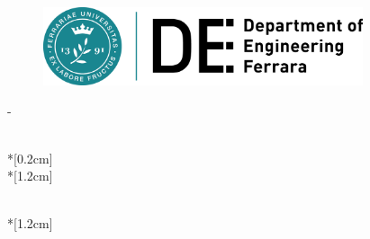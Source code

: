 \thispagestyle{empty}             %
\calccentering{\unitlength}
\begin{figure}[h!]
    \hfill\includegraphics[height=2.3cm]{graphics/DE}
    \hspace{0.5cm}
\end{figure}
\begin{adjustwidth*}{\unitlength}{-\unitlength}
    \begin{adjustwidth}{-0.5cm}{-0.5cm}
        \sffamily
        \begin{flushright}
        \end{flushright}
        \vspace*{\fill}
        \noindent
        \HUGE \thesistitle{}\\*[0.2cm]
        \Huge \thesissubtitle{}\\*[1.2cm]
        \parbox[b]{\linewidth}{%
            \LARGE 
            \thesisauthor{}\\*[1.2cm]
            \normalsize
            \thesislocation{} \the\year
        }
    \end{adjustwidth}
\end{adjustwidth*}
\normalfont
\normalsize
